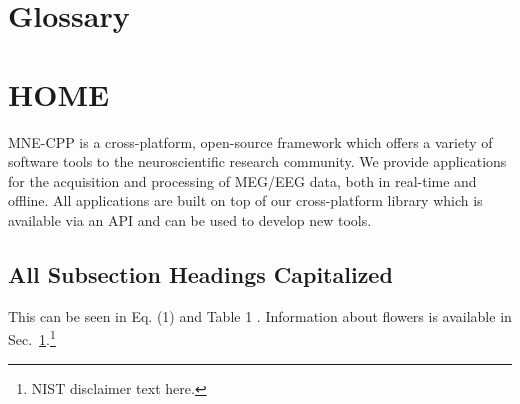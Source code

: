 \documentclass[12pt, twoside]{article}
\begin{document}
\fancyfoot[LE,RO]{\thepage}


\tableofcontents
\pagebreak
\pagebreak
\section*{Glossary}

\pagebreak


\section{HOME}
\label{sec:intro}
MNE-CPP is a cross-platform, open-source framework which offers a variety of software tools to the neuroscientific research community. We provide applications for the acquisition and processing of MEG/EEG data, both in real-time and offline. All applications are built on top of our cross-platform library which is available via an API and can be used to develop new tools.
\blindtext[10]
\subsection{All Subsection Headings Capitalized}
\label{ssec:headingscap}
This can be seen in Eq. (1) and Table 1 \cite{Roberts1982}. Information about flowers is available in Sec.~\ref{sec:intro}.\footnote{NIST disclaimer text here.}
\end{document}
